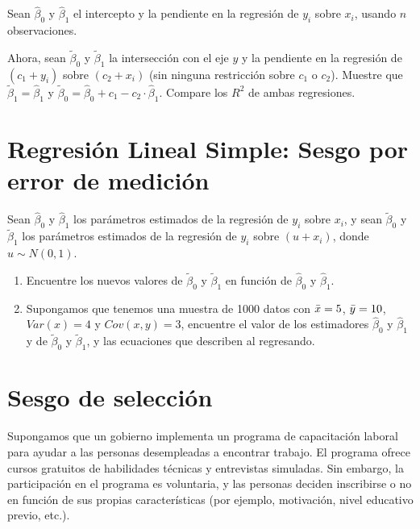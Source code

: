 \documentclass[10pt,a4paper]{article}
\begin{document}
Sean \(\hat{\beta}_0\) y \(\hat{\beta}_1\) el intercepto y la pendiente en la regresión de \(y_i\) sobre \(x_i\), usando \(n\) observaciones.

Ahora, sean \(\tilde{\beta}_0\) y \(\tilde{\beta}_1\) la intersección con el eje \(y\) y la pendiente en la regresión de \((c_1 + y_i)\) sobre \((c_2 + x_i)\) (sin ninguna restricción sobre \(c_1\) o \(c_2\)). Muestre que \(\tilde{\beta}_1 = \hat{\beta}_1\) y \(\tilde{\beta}_0 = \hat{\beta}_0 +c_1- c_2 \cdot \hat{\beta}_1\). Compare los $R^2$ de ambas regresiones.




\section{Regresión Lineal Simple: Sesgo por error de medición}

Sean \( \hat{\beta}_0 \) y \( \hat{\beta}_1 \) los parámetros estimados de la regresión de \( y_i \) sobre \( x_i \), y sean \( \tilde{\beta}_0 \) y \( \tilde{\beta}_1 \) los parámetros estimados de la regresión de \( y_i \) sobre \( (u + x_i) \), donde \( u \sim N(0, 1) \). 
\begin{enumerate}
    \item Encuentre los nuevos valores de \( \tilde{\beta}_0 \) y \( \tilde{\beta}_1 \) en función de \( \hat{\beta}_0 \) y \( \hat{\beta}_1 \).

    \item Supongamos que tenemos una muestra de 1000 datos con $\Bar{x} = 5$, $\Bar{y}=10$, $Var(x) = 4$ y $Cov(x,y)=3$, encuentre el valor de los estimadores \( \hat{\beta}_0 \) y \( \hat{\beta}_1 \) y de \( \tilde{\beta}_0 \) y \( \tilde{\beta}_1 \), y las ecuaciones que describen al regresando.

\end{enumerate}



\section{Sesgo de selección}
Supongamos que un gobierno implementa un programa de capacitación laboral para ayudar a las personas desempleadas a encontrar trabajo. El programa ofrece cursos gratuitos de habilidades técnicas y entrevistas simuladas. Sin embargo, la participación en el programa es voluntaria, y las personas deciden inscribirse o no en función de sus propias características (por ejemplo, motivación, nivel educativo previo, etc.).
\end{document}
